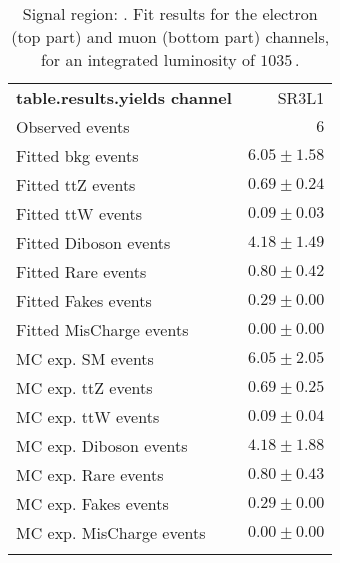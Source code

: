 

\begin{table}
\begin{center}
\setlength{\tabcolsep}{0.0pc}
{\small
\begin{tabular*}{\textwidth}{@{\extracolsep{\fill}}lr}
\noalign{\smallskip}\hline\noalign{\smallskip}
{\bf table.results.yields channel}           & SR3L1              \\[-0.05cm]
\noalign{\smallskip}\hline\noalign{\smallskip}
Observed events          & $6$                    \\
\noalign{\smallskip}\hline\noalign{\smallskip}
Fitted bkg events         & $6.05 \pm 1.58$              \\
\noalign{\smallskip}\hline\noalign{\smallskip}
        Fitted ttZ events         & $0.69 \pm 0.24$              \\
        Fitted ttW events         & $0.09 \pm 0.03$              \\
        Fitted Diboson events         & $4.18 \pm 1.49$              \\
        Fitted Rare events         & $0.80 \pm 0.42$              \\
        Fitted Fakes events         & $0.29 \pm 0.00$              \\
        Fitted MisCharge events         & $0.00 \pm 0.00$              \\
 \noalign{\smallskip}\hline\noalign{\smallskip}
MC exp. SM events              & $6.05 \pm 2.05$              \\
\noalign{\smallskip}\hline\noalign{\smallskip}
        MC exp. ttZ events         & $0.69 \pm 0.25$              \\
        MC exp. ttW events         & $0.09 \pm 0.04$              \\
        MC exp. Diboson events         & $4.18 \pm 1.88$              \\
        MC exp. Rare events         & $0.80 \pm 0.43$              \\
        MC exp. Fakes events         & $0.29 \pm 0.00$              \\
        MC exp. MisCharge events         & $0.00 \pm 0.00$              \\
\noalign{\smallskip}\hline\noalign{\smallskip}
\end{tabular*}
}
\end{center}
\caption{Signal region: . Fit results for the electron (top part) and muon (bottom part) channels, for an integrated luminosity of $1035$\,\ipb.
}
\end{table}
